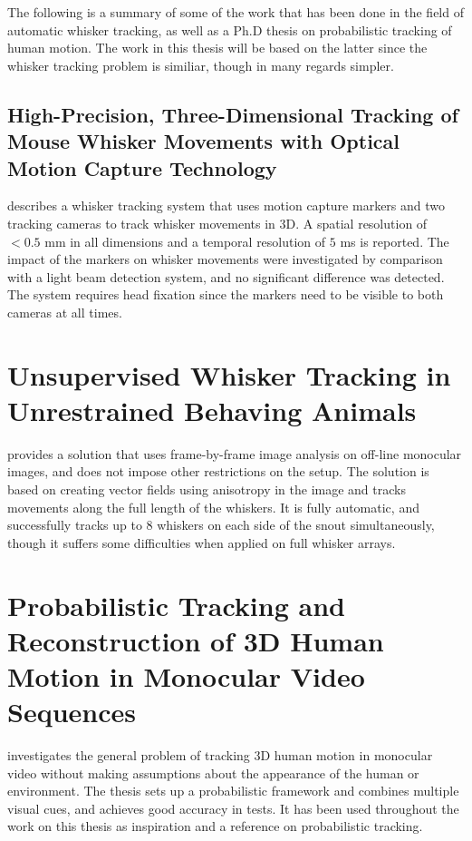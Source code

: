 The following is a summary of some of the work that has been done in
the field of automatic whisker tracking, as well as a Ph.D thesis on
probabilistic tracking of human motion. The work in this thesis will
be based on the latter since the whisker tracking problem is similiar,
though in many regards simpler.


\subsection{High-Precision, Three-Dimensional Tracking of Mouse
  Whisker Movements with Optical Motion Capture Technology}

\cite{BadExample1} describes a whisker tracking system that uses
motion capture markers and two tracking cameras to track whisker
movements in 3D. A spatial resolution of $<0.5$ mm in all dimensions
and a temporal resolution of $5$ ms is reported. The impact of the
markers on whisker movements were investigated by comparison with a
light beam detection system, and no significant difference was
detected. The system requires head fixation since the markers need to
be visible to both cameras at all times.
        

\section{Unsupervised Whisker Tracking in Unrestrained Behaving
  Animals}

\cite{UnsupervisedTracking} provides a solution that uses
frame-by-frame image analysis on off-line monocular images, and does
not impose other restrictions on the setup. The solution is based on
creating vector fields using anisotropy in the image and tracks
movements along the full length of the whiskers. It is fully
automatic, and successfully tracks up to 8 whiskers on each side of
the snout simultaneously, though it suffers some difficulties when
applied on full whisker arrays.


\section{Probabilistic Tracking and Reconstruction of 3D Human Motion
  in Monocular Video Sequences}
\cite{Hedvig} investigates the general problem of tracking 3D human
motion in monocular video without making assumptions about the
appearance of the human or environment. The thesis sets up a
probabilistic framework and combines multiple visual cues, and
achieves good accuracy in tests. It has been used throughout the work
on this thesis as inspiration and a reference on probabilistic
tracking.
